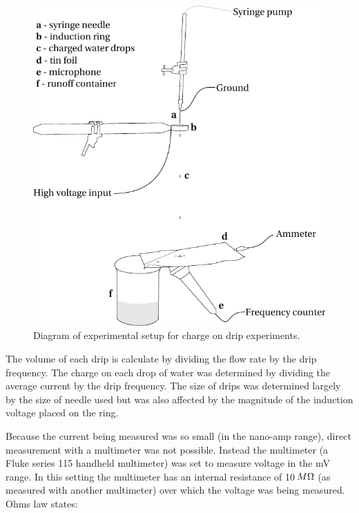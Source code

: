 \begin{figure}[h]
\begin{centering}
\includegraphics[scale=0.9]{content/appendices/chargedWaterDrops/graphics/ChargedDrips_Figure_Drawing_ExperimentalSetup}
\par\end{centering}

\protect\caption{\label{ChargedDrips_Figure_Drawing_ExperimentalSetup}Diagram of experimental
setup for charge on drip experiments.}
\end{figure}


The volume of each drip is calculate by dividing the flow rate by
the drip frequency. The charge on each drop of water was determined
by dividing the average current by the drip frequency. The size of
drips was determined largely by the size of needle used but was also
affected by the magnitude of the induction voltage placed on the ring.

Because the current being measured was so small (in the nano-amp range),
direct measurement with a multimeter was not possible. Instead the
multimeter (a Fluke series 115 handheld multimeter) was set to measure
voltage in the mV range. In this setting the multimeter has an internal
resistance of 10$\thinspace M\Omega$ (as measured with another multimeter)
over which the voltage was being measured. Ohms law states:

